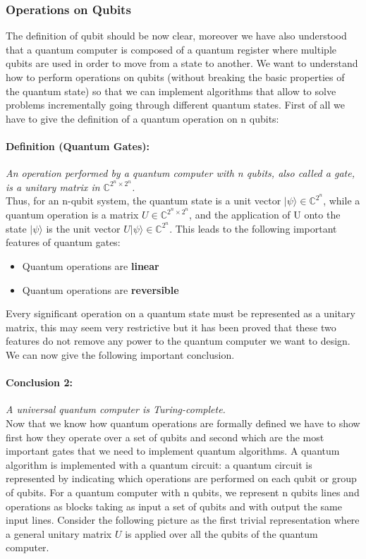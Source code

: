 \documentclass[english]{article}
\begin{document}
			\subsubsection{Operations on Qubits}
			\label{sec:operationsOnQubits}
				The definition of qubit should be now clear, moreover we have also understood that a quantum computer is composed of a quantum register where multiple qubits are used in order to move from a state to another. We want to understand how to perform operations on qubits (without breaking the basic properties of the quantum state) so that we can implement algorithms that allow to solve problems incrementally going through different quantum states. First of all we have to give the definition of a quantum operation on n qubits:
				
				\paragraph{Definition (Quantum Gates):} \emph{An operation performed by a quantum computer with n qubits, also called a gate, is a unitary matrix in $\mathbb{C}^{2^{n}\times2^{n}}$.} \\
				
				Thus, for an n-qubit system, the quantum state is a unit vector $|\psi\rangle\in\mathbb{C}^{2^{n}}$, while a quantum operation is a matrix $U\in\mathbb{C}^{2^{n}\times2^{n}}$, and the application of U onto the state $|\psi\rangle$ is the unit vector $U|\psi\rangle\in\mathbb{C}^{2^{n}}$. This leads to the following important features of quantum gates:
				\begin{itemize}
					\item Quantum operations are \textbf{linear}
					\item Quantum operations are \textbf{reversible}
				\end{itemize}
				Every significant operation on a quantum state must be represented as a unitary matrix, this may seem very restrictive but it has been proved that these two features do not remove any power to the quantum computer we want to design. We can now give the following important conclusion.
				
				\paragraph{Conclusion 2:} \label{conc:qcTuring}\emph{A universal quantum computer is Turing-complete.}\\
				
				Now that we know how quantum operations are formally defined we have to show first how they operate over a set of qubits and second which are the most important gates that we need to implement quantum algorithms. A quantum algorithm is implemented with a quantum circuit: a quantum circuit is represented by indicating which operations are performed on each qubit or group of qubits. For a quantum computer with n qubits, we represent n qubits lines and operations as blocks taking as input a set of qubits and with output the same input lines. Consider the following picture as the first trivial representation where a general unitary matrix $U$ is applied over all the qubits of the quantum computer. 
				
\end{document}
